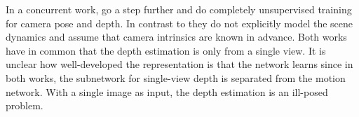 			In a concurrent work, \cite{zhou2017unsupervised} go a step further and do completely unsupervised training for camera pose and depth.
			In contrast to \citeauthor{SFMNET} they do not explicitly model the scene dynamics and assume that camera intrinsics are known in advance.
			Both works have in common that the depth estimation is only from a single view.
			It is unclear how well-developed the representation is that the network learns since in both works, the subnetwork for single-view depth is separated from the motion network.
			With a single image as input, the depth estimation is an ill-posed problem.
			



